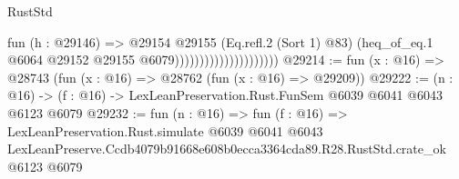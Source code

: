 \begin{lexlean}{RustStd}
\begin{coremodule}
                                          fun (h : @29146) =>
                                          @29154
                                            @29155
                                            (Eq.refl.{2} (Sort 1) @83)
                                            (heq_of_eq.{1}
                                              @6064
                                              @29152
                                              @29155
                                              @6079)))))))))))))))))))))
@29214 := fun (x : @16) => @28743 (fun (x : @16) => @28762 (fun (x : @16) => @29209))
@29222 := (n : @16) -> (f : @16) -> LexLeanPreservation.Rust.FunSem @6039 @6041 @6043 @6123 @6079
@29232 := fun (n : @16) =>
  fun (f : @16) =>
  LexLeanPreservation.Rust.simulate
    @6039
    @6041
    @6043
    LexLeanPreserve.Ccdb4079b91668e608b0ecca3364cda89.R28.RustStd.crate_ok
    @6123
    @6079
\end{coremodule}
\end{lexlean}
